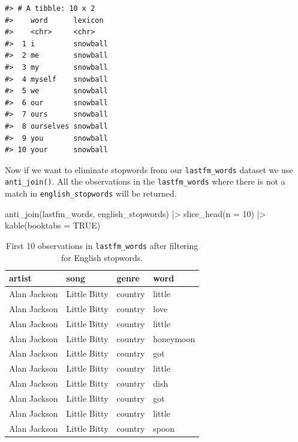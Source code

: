 \documentclass[
  letterpaper,
]{latex/krantz}
\newenvironment{Shaded}{\begin{snugshade}}{\end{snugshade}}
\newcommand{\AttributeTok}[1]{\textcolor[rgb]{0.00,0.00,0.00}{#1}}
\newcommand{\ConstantTok}[1]{\textcolor[rgb]{0.00,0.00,0.00}{#1}}
\newcommand{\DecValTok}[1]{\textcolor[rgb]{0.00,0.00,0.00}{#1}}
\newcommand{\FunctionTok}[1]{\textcolor[rgb]{0.00,0.00,0.00}{#1}}
\newcommand{\NormalTok}[1]{\textcolor[rgb]{0.00,0.00,0.00}{#1}}
\newcommand{\SpecialCharTok}[1]{\textcolor[rgb]{0.00,0.00,0.00}{#1}}
\begin{document}
\begin{verbatim}
#> # A tibble: 10 x 2
#>    word      lexicon 
#>    <chr>     <chr>   
#>  1 i         snowball
#>  2 me        snowball
#>  3 my        snowball
#>  4 myself    snowball
#>  5 we        snowball
#>  6 our       snowball
#>  7 ours      snowball
#>  8 ourselves snowball
#>  9 you       snowball
#> 10 your      snowball
\end{verbatim}

Now if we want to eliminate stopwords from our \texttt{lastfm\_words}
dataset we use \texttt{anti\_join()}. All the observations in the
\texttt{lastfm\_words} where there is not a match in
\texttt{english\_stopwords} will be returned.

\begin{Shaded}
\begin{Highlighting}[]
\FunctionTok{anti\_join}\NormalTok{(lastfm\_words, english\_stopwords) }\SpecialCharTok{|\textgreater{}} 
  \FunctionTok{slice\_head}\NormalTok{(}\AttributeTok{n =} \DecValTok{10}\NormalTok{) }\SpecialCharTok{|\textgreater{}} 
  \FunctionTok{kable}\NormalTok{(}\AttributeTok{booktabs =} \ConstantTok{TRUE}\NormalTok{)}
\end{Highlighting}
\end{Shaded}

\hypertarget{tbl-td-lastfm-words-stopwords-anti-join}{}
\begin{table}
\caption{\label{tbl-td-lastfm-words-stopwords-anti-join}First 10 observations in \texttt{lastfm\_words} after filtering for
English stopwords. }\tabularnewline

\centering
\begin{tabular}{llll}
\toprule
artist & song & genre & word\\
\midrule
Alan Jackson & Little Bitty & country & little\\
Alan Jackson & Little Bitty & country & love\\
Alan Jackson & Little Bitty & country & little\\
Alan Jackson & Little Bitty & country & honeymoon\\
Alan Jackson & Little Bitty & country & got\\
\addlinespace
Alan Jackson & Little Bitty & country & little\\
Alan Jackson & Little Bitty & country & dish\\
Alan Jackson & Little Bitty & country & got\\
Alan Jackson & Little Bitty & country & little\\
Alan Jackson & Little Bitty & country & spoon\\
\bottomrule
\end{tabular}
\end{table}
\end{document}
